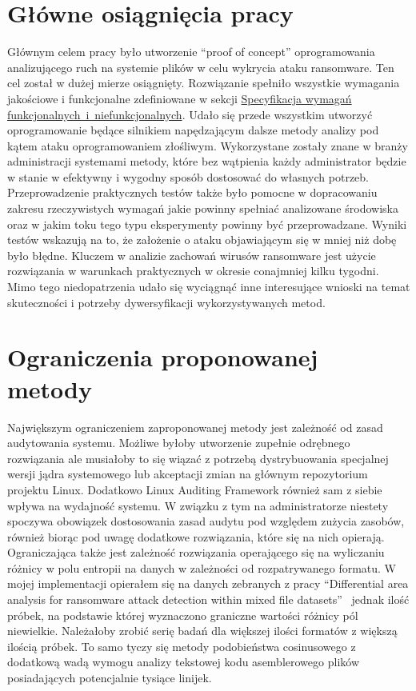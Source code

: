 \section{Główne osiągnięcia pracy}
Głównym celem pracy było utworzenie \foreignquote{english}{proof of concept} oprogramowania analizującego ruch na systemie plików w celu wykrycia ataku ransomware. Ten cel został w dużej mierze osiągnięty. Rozwiązanie spełniło wszystkie wymagania jakościowe i funkcjonalne zdefiniowane w sekcji \hyperref[sec:wymagania]{Specyfikacja wymagań funkcjonalnych~i~niefunkcjonalnych}. Udało się przede wszystkim utworzyć oprogramowanie będące silnikiem napędzającym dalsze metody analizy pod kątem ataku oprogramowaniem złośliwym. Wykorzystane zostały znane w branży administracji systemami metody, które bez wątpienia każdy administrator będzie w stanie w efektywny i wygodny sposób dostosować do własnych potrzeb.
\newline
Przeprowadzenie praktycznych testów także było pomocne w dopracowaniu zakresu rzeczywistych wymagań jakie powinny spełniać analizowane środowiska oraz w jakim toku tego typu eksperymenty powinny być przeprowadzane. Wyniki testów wskazują na to, że założenie o ataku objawiającym się w mniej niż dobę było błędne. Kluczem w analizie zachowań wirusów ransomware jest użycie rozwiązania w warunkach praktycznych w okresie conajmniej kilku tygodni. Mimo tego niedopatrzenia udało się wyciągnąć inne interesujące wnioski na temat skuteczności i potrzeby dywersyfikacji wykorzystywanych metod. 
\section{Ograniczenia proponowanej metody}
Największym ograniczeniem zaproponowanej metody jest zależność od zasad audytowania systemu. Możliwe byłoby utworzenie zupełnie odrębnego rozwiązania ale musiałoby to się wiązać z potrzebą dystrybuowania specjalnej wersji jądra systemowego lub akceptacji zmian na głównym repozytorium projektu Linux. Dodatkowo Linux Auditing Framework również sam z siebie wpływa na wydajność systemu. W związku z tym na administratorze niestety spoczywa obowiązek dostosowania zasad audytu pod względem zużycia zasobów, również biorąc pod uwagę dodatkowe rozwiązania, które się na nich opierają.
\newpage
Ograniczająca także jest zależność rozwiązania operającego się na wyliczaniu różnicy w polu entropii na danych w zależności od rozpatrywanego formatu. W mojej implementacji opierałem się na danych zebranych z pracy \foreignquote{english}{Differential area analysis for ransomware attack detection within mixed file datasets}~\cite{davies_differential_2021} jednak ilość próbek, na podstawie której wyznaczono graniczne wartości różnicy pól niewielkie. Należałoby zrobić serię badań dla większej ilości formatów z większą ilością próbek. To samo tyczy się metody podobieństwa cosinusowego z dodatkową wadą wymogu analizy tekstowej kodu asemblerowego plików posiadających potencjalnie tysiące linijek.

